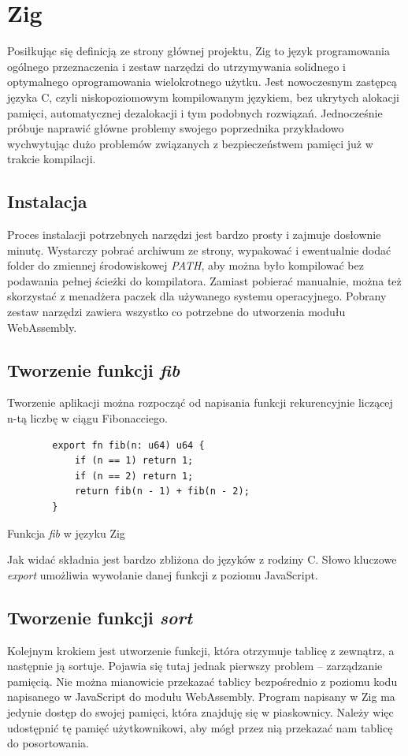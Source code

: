 \documentclass[language=polish,type=master]{aghmodern}
\begin{document}
\section{Zig}
Posiłkując się definicją ze strony głównej projektu\footnotemark{}, Zig to język programowania ogólnego przeznaczenia i zestaw narzędzi do utrzymywania solidnego i optymalnego oprogramowania wielokrotnego użytku.
Jest nowoczesnym zastępcą języka C, czyli niskopoziomowym kompilowanym językiem, bez ukrytych alokacji pamięci, automatycznej dezalokacji i tym podobnych rozwiązań.
Jednocześnie próbuje naprawić główne problemy swojego poprzednika przykładowo wychwytując dużo problemów związanych z bezpieczeństwem pamięci już w trakcie kompilacji.

\subsection{Instalacja}
Proces instalacji potrzebnych narzędzi jest bardzo prosty i zajmuje dosłownie minutę.
Wystarczy pobrać archiwum ze strony, wypakować i ewentualnie dodać folder do zmiennej środowiskowej \emph{PATH}, aby można było kompilować bez podawania pełnej ścieżki do kompilatora.
Zamiast pobierać manualnie, można też skorzystać z menadżera paczek dla używanego systemu operacyjnego.
Pobrany zestaw narzędzi zawiera wszystko co potrzebne do utworzenia modułu WebAssembly.

\subsection{Tworzenie funkcji \emph{fib}}
Tworzenie aplikacji można rozpocząć od napisania funkcji rekurencyjnie liczącej n-tą liczbę w ciągu Fibonacciego.

\begin{listing}[H]
    \begin{verbatim}
        export fn fib(n: u64) u64 {
            if (n == 1) return 1;
            if (n == 2) return 1;
            return fib(n - 1) + fib(n - 2);
        }
    \end{verbatim}
    \caption{Funkcja \emph{fib} w języku Zig}
\end{listing}

Jak widać składnia jest bardzo zbliżona do języków z rodziny C.
Słowo kluczowe \emph{export} umożliwia wywołanie danej funkcji z poziomu JavaScript.

\subsection{Tworzenie funkcji \emph{sort}}
Kolejnym krokiem jest utworzenie funkcji, która otrzymuje tablicę z zewnątrz, a następnie ją sortuje.
Pojawia się tutaj jednak pierwszy problem -- zarządzanie pamięcią.
Nie można mianowicie przekazać tablicy bezpośrednio z poziomu kodu napisanego w JavaScript do modułu WebAssembly.
Program napisany w Zig ma jedynie dostęp do swojej pamięci, która znajduję się w piaskownicy.
Należy więc udostępnić tę pamięć użytkownikowi, aby mógł przez nią przekazać nam tablicę do posortowania.
\end{document}
